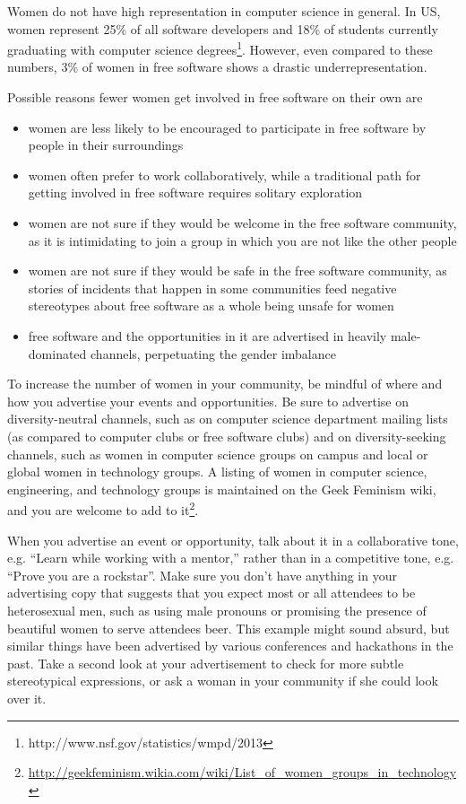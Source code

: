 Women do not have high representation in computer science in general. In US, women represent 25\% of all software developers and 18\% of students currently graduating with computer science degrees\footnote{http://www.nsf.gov/statistics/wmpd/2013}. However, even compared to these numbers, 3\% of women in free software shows a drastic underrepresentation.

Possible reasons fewer women get involved in free software on their own are
\begin{itemize}
 \item women are less likely to be encouraged to participate in free software by people in their surroundings
 \item women often prefer to work collaboratively, while a traditional path for getting involved in free software requires solitary exploration
 \item women are not sure if they would be welcome in the free software community, as it is intimidating to join a group in which you are not like the other people
 \item women are not sure if they would be safe in the free software community, as stories of incidents that happen in some communities feed negative stereotypes about free software as a whole being unsafe for women
 \item free software and the opportunities in it are advertised in heavily male-dominated channels, perpetuating the gender imbalance
\end{itemize}

To increase the number of women in your community, be mindful of where and how you advertise your events and opportunities. Be sure to advertise on diversity-neutral channels, such as on computer science department mailing lists (as compared to computer clubs or free software clubs) and on diversity-seeking channels, such as women in computer science groups on campus and local or global women in technology groups. A listing of women in computer science, engineering, and technology groups is maintained on the Geek Feminism wiki, and you are welcome to add to it\footnote{\url{http://geekfeminism.wikia.com/wiki/List_of_women_groups_in_technology}}.

When you advertise an event or opportunity, talk about it in a collaborative tone, e.g.  “Learn while working with a mentor,” rather than in a competitive tone, e.g. “Prove you are a rockstar”. Make sure you don’t have anything in your advertising copy that suggests that you expect most or all attendees to be heterosexual men, such as using male pronouns or promising the presence of beautiful women to serve attendees beer. This example might sound absurd, but similar things have been advertised by various conferences and hackathons in the past. Take a second look at your advertisement to check for more subtle stereotypical expressions, or ask a woman in your community if she could look over it.

